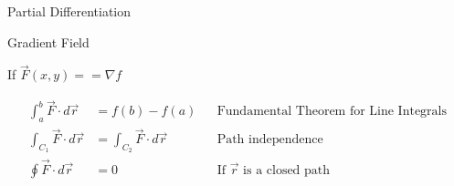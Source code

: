 \begin{section}{Partial Differentiation}
  \begin{section}{Gradient Field}

    If $\vec{F}(x,y) == \nabla{f}$

    \begin{align*}
      \int_a^b \vec{F} \cdot d\vec{r} &= f(b) - f(a) &&
      \text{Fundamental Theorem for Line Integrals}\\
      \int_{C_1} \vec{F} \cdot d\vec{r} &= \int_{C_2} \vec{F} \cdot d\vec{r} &&
      \text{Path independence}\\
      \oint \vec{F} \cdot d\vec{r} &= 0 &&
      \text{If $\vec{r}$ is a closed path}\\
    \end{align*}
  \end{section}


\end{section}
